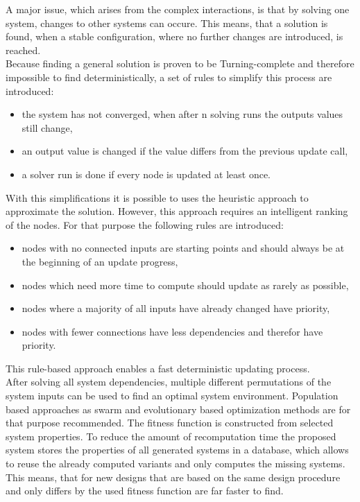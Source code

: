 A major issue, which arises from the complex interactions, is that by solving one system, changes to other systems can occure.
This means, that a solution is found, when a stable configuration, where no further changes are introduced, is reached.\\
Because finding a general solution is proven to be Turning-complete and therefore impossible to find deterministically, 
a set of rules to simplify this process are introduced:
\begin{itemize}
    \item the system has not converged, when after n solving runs the outputs values still change,
    \item an output value is changed if the value differs from the previous update call,
    \item a solver run is done if every node is updated at least once.
\end{itemize}
With this simplifications it is possible to uses the heuristic approach to approximate the solution.
However, this approach requires an intelligent ranking of the nodes.
For that purpose the following rules are introduced:
\begin{itemize}
    \item nodes with no connected inputs are starting points and should always be at the beginning of an update progress,
    \item nodes which need more time to compute should update as rarely as possible,
    \item nodes where a majority of all inputs have already changed have priority,
    \item nodes with fewer connections have less dependencies and therefor have priority.
\end{itemize}
This rule-based approach enables a fast deterministic updating process.\\
After solving all system dependencies, multiple different permutations of the system inputs can be used to find an optimal system environment.
Population based approaches as swarm and evolutionary based optimization methods are for that purpose recommended.
The fitness function is constructed from selected system properties.
To reduce the amount of recomputation time the proposed system stores the properties of all generated systems
in a database, which allows to reuse the already computed variants and only computes the missing systems.
This means, that for new designs that are based on the same design procedure and only differs by the used fitness function are far faster to find.